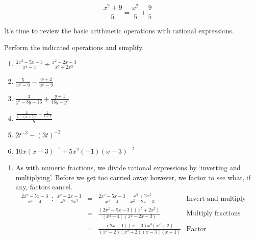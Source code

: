 \documentclass{ximera}
\begin{document}
\[ \frac{x^2+9}{5} = \frac{x^2}{5} + \frac{9}{5} \] 

It's time to review the basic arithmetic operations with rational expressions. 

\pagebreak

\begin{example} \label{rationalexpressionreviewex} Perform the indicated operations and simplify.


\begin{enumerate}

\item  $\frac{2x^2-5x-3}{x^4 - 4} \div \frac{x^2-2x-3}{x^5 + 2x^3}$

\item  $\frac{5}{w^2 - 9} - \frac{w+2}{w^2-9}$

\item  $\frac{3}{y^2 - 8y + 16} + \frac{y+1}{16y - y^3}$

\item  $\frac{\frac{2}{4 - (x+h)} - \frac{2}{4-x}}{h}$

\item  $2t^{-3} - (3t)^{-2}$

\item  $10x(x-3)^{-1} + 5x^2(-1)(x-3)^{-2}$

\setcounter{HW}{\value{enumi}}
\end{enumerate}

\begin{explanation}

\begin{enumerate}

\item As with numeric fractions, we divide rational expressions by `inverting and multiplying'.  Before we get too carried away however, we factor to see what, if any, factors cancel.\[ \begin{array}{rclr}

\frac{2x^2-5x-3}{x^4 - 4} \div \frac{x^2-2x-3}{x^5 + 2x^3} & = & \frac{2x^2-5x-3}{x^4 - 4} \cdot \frac{x^5 + 2x^3}{x^2-2x-3} & \text{Invert and multiply} \\  

& = & \frac{(2x^2-5x-3)(x^5 + 2x^3)}{(x^4 - 4)(x^2-2x-3)} & \text{Multiply fractions}  \\  

& = & \frac{(2x+1)(x-3)x^3(x^2+2)}{(x^2-2)(x^2+2)(x-3)(x+1)} & \text{Factor} \\  


\end{array}\]
\end{enumerate}
\end{explanation}
\end{example}
\end{document}
